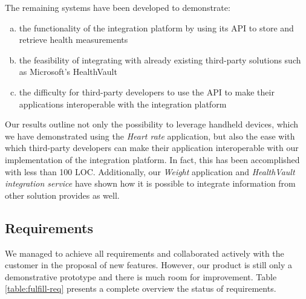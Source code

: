 The remaining systems have been developed to demonstrate:
\begin{enumerate}[a.]
\item the functionality of the integration platform by using its API to store and retrieve health measurements
\item the feasibility of integrating with already existing third-party solutions such as Microsoft's HealthVault
\item the difficulty for third-party developers to use the API to make their applications interoperable with the integration platform
\end{enumerate}

Our results outline not only the possibility to leverage handheld devices, which we have demonstrated
using the \textit{Heart rate} application, but also the ease with which third-party developers can make
their application interoperable with our implementation of the integration platform.
In fact, this has been accomplished with less than 100 LOC.
Additionally, our \textit{Weight} application and \textit{HealthVault integration service} have shown how
it is possible to integrate information from other solution provides as well.


\subsection{Requirements}

We managed to achieve all requirements and collaborated actively with the customer in the proposal
of new features. However, our product is still only a demonstrative prototype and there is
much room for improvement. Table \ref{table:fulfill-req} presents a complete overview the status of requirements.

